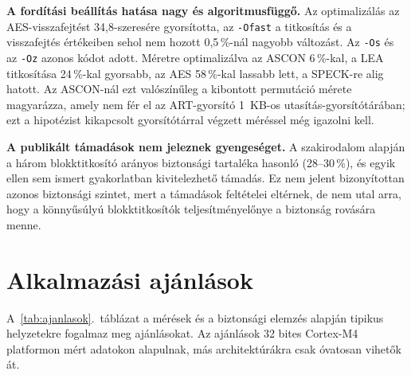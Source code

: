 \documentclass[a4paper,12pt]{report}
\theoremstyle{definition}
\theoremstyle{remark}
\begin{document}
\textbf{A fordítási beállítás hatása nagy és algoritmusfüggő.} Az optimalizálás az AES-visszafejtést 34,8-szeresére gyorsította, az \texttt{-Ofast} a titkosítás és a visszafejtés értékeiben sehol nem hozott 0,5\,\%-nál nagyobb változást. Az \texttt{-Os} és az \texttt{-Oz} azonos kódot adott. Méretre optimalizálva az ASCON 6\,\%-kal, a LEA titkosítása 24\,\%-kal gyorsabb, az AES 58\,\%-kal lassabb lett, a SPECK-re alig hatott. Az ASCON-nál ezt valószínűleg a kibontott permutáció mérete magyarázza, amely nem fér el az ART-gyorsító 1~KB-os utasítás-gyorsítótárában; ezt a hipotézist kikapcsolt gyorsítótárral végzett méréssel még igazolni kell.

\textbf{A publikált támadások nem jeleznek gyengeséget.} A szakirodalom alapján a három blokktitkosító arányos biztonsági tartaléka hasonló (28--30\,\%), és egyik ellen sem ismert gyakorlatban kivitelezhető támadás. Ez nem jelent bizonyítottan azonos biztonsági szintet, mert a támadások feltételei eltérnek, de nem utal arra, hogy a könnyűsúlyú blokktitkosítók teljesítményelőnye a biztonság rovására menne.

\section{Alkalmazási ajánlások}

A~\ref{tab:ajanlasok}.~táblázat a mérések és a biztonsági elemzés alapján tipikus helyzetekre fogalmaz meg ajánlásokat. Az ajánlások 32 bites Cortex-M4 platformon mért adatokon alapulnak, más architektúrákra csak óvatosan vihetők át.
\end{document}
